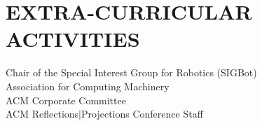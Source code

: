 	\section{EXTRA-CURRICULAR \\ ACTIVITIES}
	Chair of the Special Interest Group for Robotics (SIGBot)\\
	Association for Computing Machinery\\
	ACM Corporate Committee\\
	ACM Reflections$|$Projections Conference Staff

